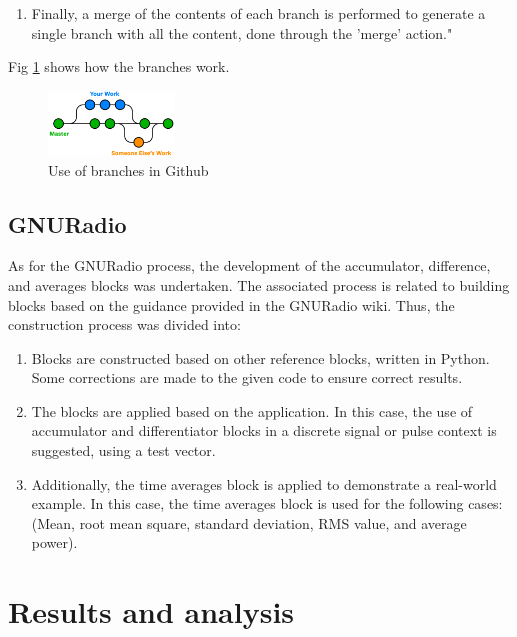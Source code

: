 \documentclass{journal}[IEEEtran, twocolumn]             %
\begin{document}
\begin{multicols}{2}
\begin{enumerate}
    \item Finally, a merge of the contents of each branch is performed to generate a single branch with all the content, done through the 'merge' action."
\end{enumerate}

Fig \ref{fig:fig_1} shows how the branches work.

    \begin{figure}[H]
        \centering
        \begin{adjustbox}{frame=1pt 1pt,center=1pt}
            \includegraphics[width=0.3\textwidth]{figs/branch.png}
        \end{adjustbox}
        \caption{\centering Use of branches in Github}
        \label{fig:fig_1}
    \end{figure}

\subsection{GNURadio}

As for the GNURadio process, the development of the accumulator, difference, and averages blocks was undertaken. The associated process is related to building blocks based on the guidance provided in the GNURadio wiki. Thus, the construction process was divided into:

\begin{enumerate}

\item Blocks are constructed based on other reference blocks, written in Python. Some corrections are made to the given code to ensure correct results.
\item The blocks are applied based on the application. In this case, the use of accumulator and differentiator blocks in a discrete signal or pulse context is suggested, using a test vector.
\item Additionally, the time averages block is applied to demonstrate a real-world example. In this case, the time averages block is used for the following cases: (Mean, root mean square, standard deviation, RMS value, and average power).

\end{enumerate}
    
\section{Results and analysis}


\end{multicols}
\end{document}
